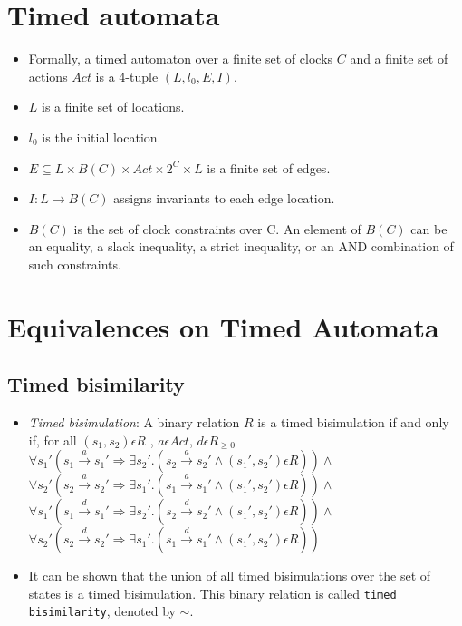\documentclass{article}
\begin{document}
\section{Timed automata}

  \begin{itemize}
  \item Formally, a timed automaton over a finite set of clocks $C$
    and a finite set of actions $Act$ is a 4-tuple $(L, l_{0}, E, I)$.
  \item $L$ is a finite set of locations.
  \item $l_{0}$ is the initial location.
  \item $E \subseteq L \times B(C) \times Act \times 2^{C} \times L$
    is a finite set of edges.
  \item $I: L \rightarrow B(C)$ assigns invariants to each edge
    location.
  \item $B(C)$ is the set of clock constraints over C. An element of $B(C)$
    can be an equality, a slack inequality, a strict inequality, or
    an AND combination of such constraints.
  \end{itemize}

\section{Equivalences on Timed Automata}

\subsection{Timed bisimilarity}

\begin{itemize}
  \item \emph{Timed bisimulation}: A binary relation $R$ is a timed
    bisimulation if and only if, for all $(s_1, s_2) \epsilon R$ , $a \epsilon Act $, $d \epsilon R_{\ge 0}$\\
    $\forall s_1' (s_1 \xrightarrow{a} s_1' \Rightarrow \exists s_2'
    . (s_2 \xrightarrow{a} s_2' \wedge (s_1', s_2') \epsilon R ) )
    \wedge $ \\
    $\forall s_2' (s_2 \xrightarrow{a} s_2' \Rightarrow \exists s_1'
    . (s_1 \xrightarrow{a} s_1' \wedge (s_1', s_2') \epsilon R ) ) \wedge $ \\
    $\forall s_1' (s_1 \xrightarrow{d} s_1' \Rightarrow \exists s_2'
    . (s_2 \xrightarrow{d} s_2' \wedge (s_1', s_2') \epsilon R ) )
    \wedge $ \\
    $\forall s_2' (s_2 \xrightarrow{d} s_2' \Rightarrow \exists s_1'
    . (s_1 \xrightarrow{d} s_1' \wedge (s_1', s_2') \epsilon R ) ) $ \\
    
  \item It can be shown that the union of all timed bisimulations
    over the set of states is a timed bisimulation. This binary
    relation is called \texttt{timed bisimilarity}, denoted by $\sim$.
\end{itemize}
\end{document}
